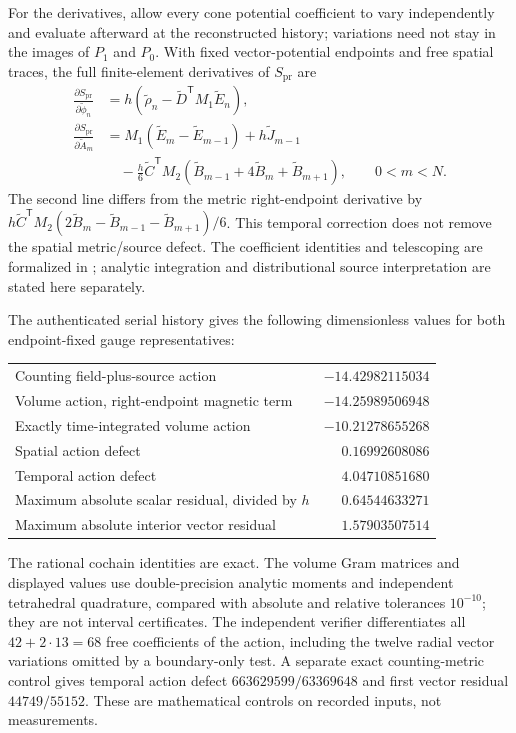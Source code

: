 For the derivatives, allow every cone potential coefficient to vary
independently and evaluate afterward at the reconstructed history; variations
need not stay in the images of \(P_1\) and \(P_0\).
With fixed vector-potential endpoints and free spatial traces, the full
finite-element derivatives of \(S_{\mathrm{pr}}\) are
\begin{align*}
 \frac{\partial S_{\mathrm{pr}}}{\partial\widetilde\phi_n}
 &=h\left(\widetilde\rho_n-\widetilde D^{\mathsf T}M_1\widetilde E_n\right),\\
 \frac{\partial S_{\mathrm{pr}}}{\partial\widetilde A_m}
 &=M_1(\widetilde E_m-\widetilde E_{m-1})+h\widetilde J_{m-1}\\
 &\quad-\frac h6\widetilde C^{\mathsf T}M_2
 (\widetilde B_{m-1}+4\widetilde B_m+\widetilde B_{m+1}),
 \qquad 0<m<N.
\end{align*}
The second line differs from the metric right-endpoint derivative by
\(h\widetilde C^{\mathsf T}M_2(2\widetilde B_m-
\widetilde B_{m-1}-\widetilde B_{m+1})/6\).
This temporal correction does not remove the spatial metric/source defect.
The coefficient identities and telescoping are formalized in
; analytic integration and
distributional source interpretation are stated here separately.

The authenticated serial history gives the following dimensionless values
for both endpoint-fixed gauge representatives:
\begin{center}
\begin{tabular}{lr}
Counting field-plus-source action & $-14.42982115034$\\
Volume action, right-endpoint magnetic term & $-14.25989506948$\\
Exactly time-integrated volume action & $-10.21278655268$\\
Spatial action defect & $0.16992608086$\\
Temporal action defect & $4.04710851680$\\
Maximum absolute scalar residual, divided by $h$ & $0.64544633271$\\
Maximum absolute interior vector residual & $1.57903507514$
\end{tabular}
\end{center}
The rational cochain identities are exact. The volume Gram matrices and
displayed values use double-precision analytic moments and independent
tetrahedral quadrature, compared with absolute and relative tolerances
\(10^{-10}\); they are not interval certificates. The independent verifier
differentiates all \(42+2\cdot13=68\) free coefficients of the action,
including the twelve radial vector variations omitted by a boundary-only
test. A separate exact counting-metric control gives temporal action defect
\(663629599/63369648\) and first vector residual \(44749/55152\).
These are mathematical controls on recorded inputs, not measurements.

